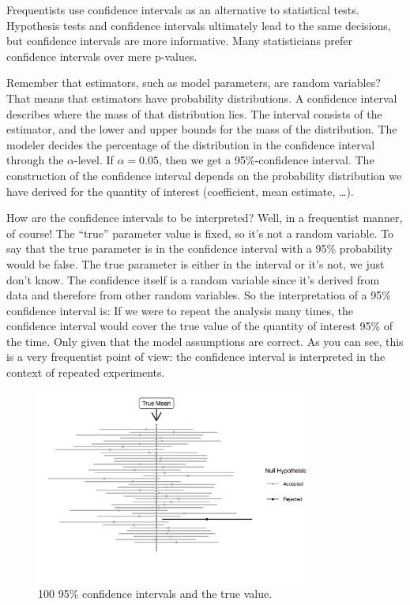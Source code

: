 \documentclass[
  10pt,
]{scrbook}
\begin{document}
Frequentists use confidence intervals as an alternative to statistical tests.
Hypothesis tests and confidence intervals ultimately lead to the same decisions, but confidence intervals are more informative.
Many statisticians prefer confidence intervals over mere p-values.

Remember that estimators, such as model parameters, are random variables?
That means that estimators have probability distributions.
A confidence interval describes where the mass of that distribution lies.
The interval consists of the estimator, and the lower and upper bounds for the mass of the distribution.
The modeler decides the percentage of the distribution in the confidence interval through the \(\alpha\)-level.
If \(\alpha = 0.05\), then we get a 95\%-confidence interval.
The construction of the confidence interval depends on the probability distribution we have derived for the quantity of interest (coefficient, mean estimate, \ldots).

How are the confidence intervals to be interpreted?
Well, in a frequentist manner, of course!
The ``true'' parameter value is fixed, so it's not a random variable.
To say that the true parameter is in the confidence interval with a 95\% probability would be false.
The true parameter is either in the interval or it's not, we just don't know.
The confidence itself is a random variable since it's derived from data and therefore from other random variables.
So the interpretation of a 95\% confidence interval is:
If we were to repeat the analysis many times, the confidence interval would cover the true value of the quantity of interest 95\% of the time.
Only given that the model assumptions are correct.
As you can see, this is a very frequentist point of view: the confidence interval is interpreted in the context of repeated experiments.

\begin{figure}

{\centering \includegraphics[width=0.8\textwidth]{figures/ci-1} 

}

\caption{100 95\% confidence intervals and the true value.}\label{fig:ci}
\end{figure}
\end{document}

